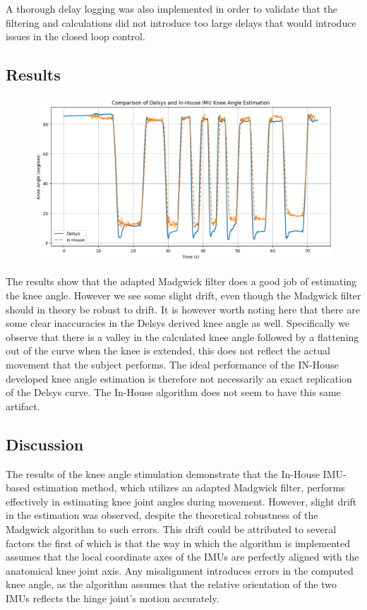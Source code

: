 A thorough delay logging was also implemented in order to validate that the filtering and calculations did not introduce too large delays that would introduce issues in the closed loop control. 

\subsection{Results}
\begin{figure} [H]
    \centering
    \includegraphics[width=0.95\linewidth]{images/T11_betterplotting.png}
    \caption{}
    \label{fig:t11}
\end{figure}

The results show that the adapted Madgwick filter does a good job of estimating the knee angle. However we see some slight drift, even though the Madgwick filter should in theory be robust to drift. It is however worth noting here that there are some clear inaccuracies in the Delsys derived knee angle as well. Specifically we observe that there is a valley in the calculated knee angle followed by a flattening out of the curve when the knee is extended, this does not reflect the actual movement that the subject performs. The ideal performance of the IN-House developed knee angle estimation is therefore not necessarily an exact replication of the Delsys curve. The In-House algorithm does not seem to have this same artifact.

\subsection{Discussion}
The results of the knee angle stimulation demonstrate that the In-House IMU-based estimation method, which utilizes an adapted Madgwick filter, performs effectively in estimating knee joint angles during movement. However, slight drift in the estimation was observed, despite the theoretical robustness of the Madgwick algorithm to such errors. This drift could be attributed to several factors the first of which is that the way in which the algorithm is implemented assumes that the local coordinate axes of the IMUs are perfectly aligned with the anatomical knee joint axis. Any misalignment introduces errors in the computed knee angle, as the algorithm assumes that the relative orientation of the two IMUs reflects the hinge joint's motion accurately.

